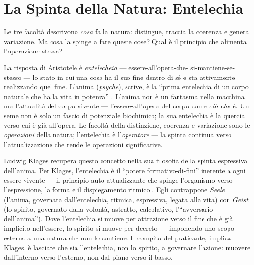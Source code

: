 \section{La Spinta della Natura: Entelechia}

Le tre facolt\`a descrivono \emph{cosa} fa la natura: distingue, traccia
la coerenza e genera variazione. Ma cosa la spinge a fare queste cose?
Qual \`e il principio che alimenta l'operazione stessa?

La risposta di Aristotele \`e \emph{entelecheia} --- essere-all'opera-che-
si-mantiene-se-stesso --- lo stato in cui una cosa ha il suo fine dentro
di s\'e e sta attivamente realizzando quel fine. L'anima (\emph{psyche}),
scrive, \`e la ``prima entelechia di un corpo naturale che ha la vita in
potenza'' \parencite[II.1]{aristotle1986anima}. L'anima non \`e un fantasma
nella macchina ma l'attualit\`a del corpo vivente --- l'essere-all'opera
del corpo come \emph{ci\`o che \`e}. Un seme non \`e solo un fascio di
potenziale biochimico; la sua entelechia \`e la quercia verso cui \`e
gi\`a all'opera. Le facolt\`a della distinzione, coerenza e variazione
sono le \emph{operazioni} della natura; l'entelechia \`e
l'\emph{operatore} --- la spinta continua verso l'attualizzazione che
rende le operazioni significative.

Ludwig Klages recupera questo concetto nella sua filosofia della spinta
espressiva dell'anima. Per Klages, l'entelechia \`e il ``potere
formativo-di-fini'' inerente a ogni essere vivente --- il principio
auto-attualizzante che spinge l'organismo verso l'espressione, la forma
e il dispiegamento ritmico \parencite{klages1929geist}. Egli contrappone
\emph{Seele} (l'anima, governata dall'entelechia, ritmica, espressiva,
legata alla vita) con \emph{Geist} (lo spirito, governato dalla volont\`a,
astratto, calcolativo, l'``avversario dell'anima''). Dove l'entelechia
si muove per attrazione verso il fine che \`e gi\`a implicito nell'essere,
lo spirito si muove per decreto --- imponendo uno scopo esterno a una
natura che non lo contiene. Il compito del praticante, implica Klages,
\`e lasciare che sia l'entelechia, non lo spirito, a governare l'azione:
muovere dall'interno verso l'esterno, non dal piano verso il basso.

